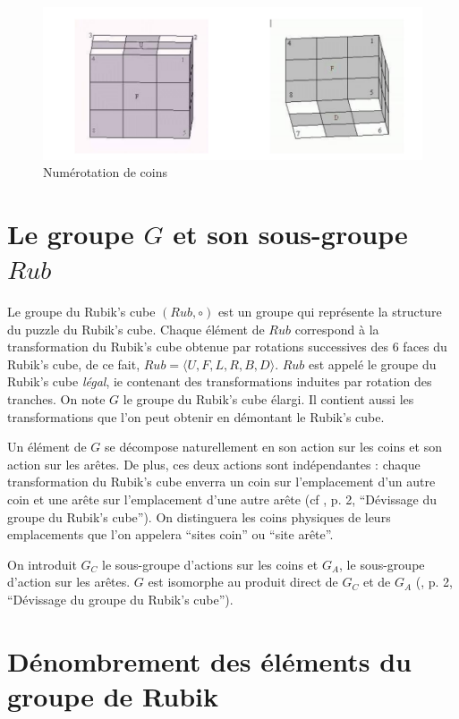 \documentclass[french]{report}
\begin{document}
\begin{figure}[h!]
  \centering
  \includegraphics[scale=0.3]{figures/num_coins.png}
  \caption{Numérotation de coins}
  \label{num_coins}
\end{figure}

\section{\texorpdfstring{Le groupe $G$ et son sous-groupe $Rub$}{}}


Le groupe du Rubik's cube $(Rub, \circ)$ est un groupe qui représente la structure du puzzle du Rubik's cube. Chaque élément de $Rub$ correspond à la transformation du Rubik's cube obtenue par rotations successives des 6 faces du Rubik's cube, de ce fait, $Rub = \langle U, F, L, R, B, D \rangle $. $Rub$ est appelé le groupe du Rubik's cube \emph{légal}, ie contenant des transformations induites par rotation des tranches. On note $G$ le groupe du Rubik's cube élargi. Il contient aussi les transformations que l'on peut obtenir en démontant le Rubik's cube.

Un élément de $G$ se décompose naturellement en son action sur les coins et son action sur les arêtes. De plus, ces deux actions sont indépendantes : chaque transformation du Rubik's cube enverra un coin sur l'emplacement d'un autre coin et une arête sur l'emplacement d'une autre arête (cf \cite{colmez_rubik}, p. 2, ``Dévissage du groupe du Rubik's cube''). On distinguera les coins physiques de leurs emplacements que l'on appelera ``sites coin'' ou ``site arête''.

On introduit $G_C$  le sous-groupe d'actions sur les coins et $G_A$, le sous-groupe d'action sur les arêtes. $G$ est isomorphe au produit direct de $G_C$ et de $G_A$ (\cite{colmez_rubik}, p. 2, ``Dévissage du groupe du Rubik's cube'').

\section{Dénombrement des éléments du groupe de Rubik}
\end{document}

